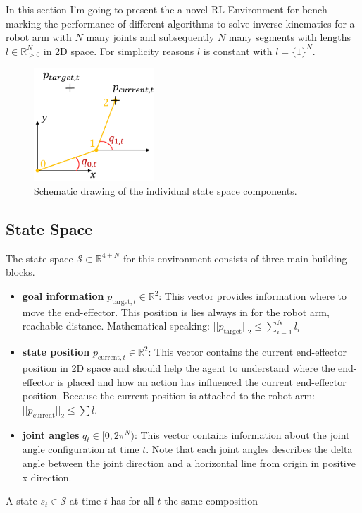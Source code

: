 In this section I'm going to present the a novel RL-Environment for bench-marking the performance of different algorithms to solve inverse kinematics for a robot arm with $N$ many joints and subsequently $N$ many segments with lengths $l \in\mathbb{R}_{>0}^N$ in 2D space. For simplicity reasons $l$ is constant with $l = \{ 1 \}^N$.

\begin{figure}[h]
	\centering
	\includegraphics[width=0.4\textwidth,]{figures/methodology/EnvExample.png}
	\caption[Plane Robot Environment]{Schematic drawing of the individual state space components.}
	\label{fig:plane_robot_env}
\end{figure}

\subsection{State Space}

The state space $\mathcal{S} \subset \mathbb{R}^{4 + N}$ for this environment consists of three main building blocks. 

\begin{itemize}
    \item \textbf{goal information} $p_{\text{target}, t} \in \mathbb{R}^2$: This vector provides information where to move the end-effector. This position is lies always in for the robot arm, reachable distance. Mathematical speaking: $||p_\text{target}||_2 \leq \sum_{i = 1}^N l_i$ 
    \item \textbf{state position} $p_{\text{current},t} \in \mathbb{R}^2$: This vector contains the current end-effector position in 2D space and should help the agent to understand where the end-effector is placed and how an action has influenced the current end-effector position. Because the current position is attached to the robot arm: $||p_\text{current}||_2 \leq \sum l$.
    \item \textbf{joint angles} $q_t \in [0, 2\pi^N)$: This vector contains information about the joint angle configuration at time $t$. Note that each joint angles describes the delta angle between the joint direction and a horizontal line from origin in positive x direction.
\end{itemize}
A state $s_t \in \mathcal{S}$ at time $t$ has for all $t$ the same composition

